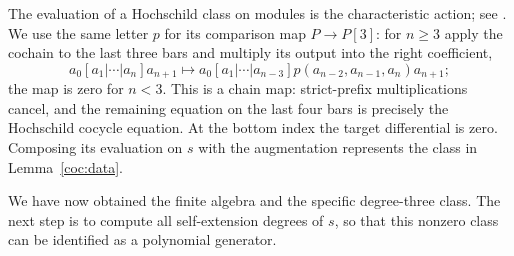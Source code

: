 The evaluation of a Hochschild class on modules is the characteristic action; see \cite[Section 4.3]{Lowen2008}. We use the same letter $p$ for its comparison map $P\to P[3]$:
for $n\ge3$ apply the cochain to the last three bars and multiply its
output into the right coefficient,
\begin{equation}
 a_0[a_1|\cdots|a_n]a_{n+1}\longmapsto
 a_0[a_1|\cdots|a_{n-3}]
 p(a_{n-2},a_{n-1},a_n)a_{n+1};
\label{coc:comparison}
\end{equation}
the map is zero for $n<3$.  This is a chain map: strict-prefix
multiplications cancel, and the remaining equation on the last
four bars is precisely the Hochschild cocycle equation.  At the
bottom index the target differential is zero.  Composing its
evaluation on $s$ with the augmentation represents the class in
Lemma~\ref{coc:data}.

We have now obtained the finite algebra and the specific degree-three
class.  The next step is to compute all self-extension degrees of
$s$, so that this nonzero class can be identified as a polynomial
generator.
